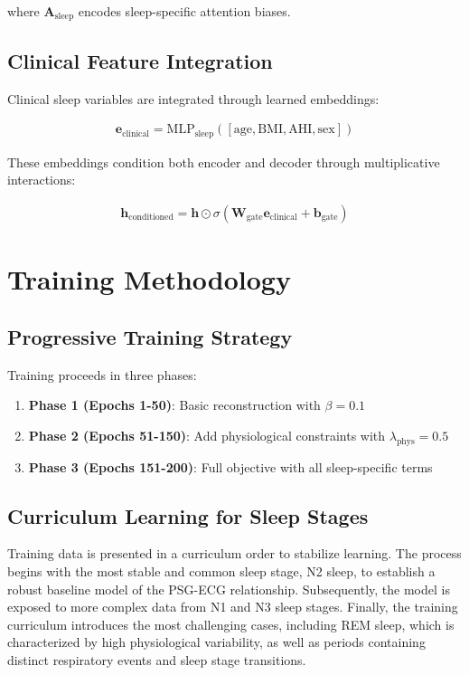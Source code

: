 \documentclass[11pt,en]{elegantpaper}
\begin{document}
where $\mathbf{A}_{\text{sleep}}$ encodes sleep-specific attention biases.

\subsection{Clinical Feature Integration}

Clinical sleep variables are integrated through learned embeddings:

\begin{align}
\mathbf{e}_{\text{clinical}} = \text{MLP}_{\text{sleep}}([\text{age}, \text{BMI}, \text{AHI}, \text{sex}])
\end{align}

These embeddings condition both encoder and decoder through multiplicative interactions:

\begin{align}
\mathbf{h}_{\text{conditioned}} = \mathbf{h} \odot \sigma(\mathbf{W}_{\text{gate}} \mathbf{e}_{\text{clinical}} + \mathbf{b}_{\text{gate}})
\end{align}

\section{Training Methodology}

\subsection{Progressive Training Strategy}

Training proceeds in three phases:

\begin{enumerate}
\item \textbf{Phase 1 (Epochs 1-50)}: Basic reconstruction with $\beta = 0.1$
\item \textbf{Phase 2 (Epochs 51-150)}: Add physiological constraints with $\lambda_{\text{phys}} = 0.5$
\item \textbf{Phase 3 (Epochs 151-200)}: Full objective with all sleep-specific terms
\end{enumerate}

\subsection{Curriculum Learning for Sleep Stages}

Training data is presented in a curriculum order to stabilize learning. The process begins with the most stable and common sleep stage, N2 sleep, to establish a robust baseline model of the PSG-ECG relationship. Subsequently, the model is exposed to more complex data from N1 and N3 sleep stages. Finally, the training curriculum introduces the most challenging cases, including REM sleep, which is characterized by high physiological variability, as well as periods containing distinct respiratory events and sleep stage transitions.
\end{document}
